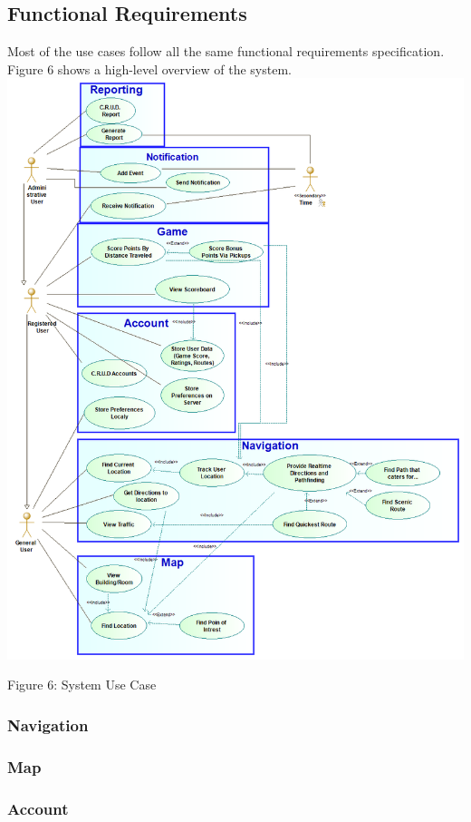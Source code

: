 \documentclass{article}
\begin{document}
    	\subsection{Functional Requirements}

    	
    	Most of the use cases follow all the same functional requirements specification. Figure 6 shows a high-level overview of the system. \\
    	\includegraphics[width=\textwidth]{System_Use_Case_Diagram}
    	\begin{center}
    	Figure 6: System Use Case
    	\end{center}
    	\subsubsection{Navigation}
    	
    	\subsubsection{Map}
    	
    	\subsubsection{Account}
    	
\end{document}
